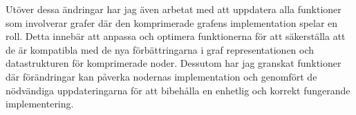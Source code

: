 Utöver dessa ändringar har jag även arbetat med att uppdatera alla funktioner som involverar grafer där den komprimerade grafens
implementation spelar en roll. Detta innebär att anpassa och optimera funktionerna för att säkerställa att de är kompatibla med
de nya förbättringarna i graf representationen och datastrukturen för komprimerade noder. Dessutom har jag granskat funktioner där
förändringar kan påverka nodernas implementation och genomfört de nödvändiga uppdateringarna för att bibehålla en enhetlig och
korrekt fungerande implementering.

